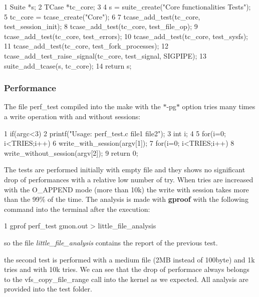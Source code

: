\begin{DoxyCode}
1 Suite *s;
2     TCase *tc\_core;
3 
4     s = suite\_create("Core functionalities Tests");
5     tc\_core = tcase\_create("Core");
6 
7     tcase\_add\_test(tc\_core, test\_session\_init);
8     tcase\_add\_test(tc\_core, test\_file\_op);
9     tcase\_add\_test(tc\_core, test\_errors);
10     tcase\_add\_test(tc\_core, test\_sysfs);
11     tcase\_add\_test(tc\_core, test\_fork\_processes);
12     tcase\_add\_test\_raise\_signal(tc\_core, test\_signal, SIGPIPE);
13     suite\_add\_tcase(s, tc\_core);
14     return s;
\end{DoxyCode}
 \subsubsection*{Performance}

The file perf\+\_\+test compiled into the make with the $\ast$-\/pg$\ast$ option tries many times a write operation with and without sessions\+: 
\begin{DoxyCode}
1 if(argc<3)
2     printf("Usage: perf\_test.c file1 file2");
3 int i;
4 
5 for(i=0; i<TRIES;i++)
6     write\_with\_session(argv[1]);
7 for(i=0; i<TRIES;i++)
8     write\_without\_session(argv[2]);
9 return 0;
\end{DoxyCode}


The tests are performed initially with empty file and they shows no significant drop of performances with a relative low number of try. When tries are increased with the O\+\_\+\+A\+P\+P\+E\+ND mode (more than 10k) the write with session takes more than the 99\% of the time. The analysis is made with {\bfseries gproof} with the following command into the terminal after the execution\+: 
\begin{DoxyCode}
1 gprof perf\_test gmon.out > little\_file\_analysis
\end{DoxyCode}
 so the file {\itshape little\+\_\+file\+\_\+analysis} contains the report of the previous test.

the second test is performed with a medium file (2\+MB instead of 100byte) and 1k tries and with 10k tries. We can see that the drop of performace always belongs to the vfs\+\_\+copy\+\_\+file\+\_\+range call into the kernel as we expected. All analysis are provided into the test folder. 